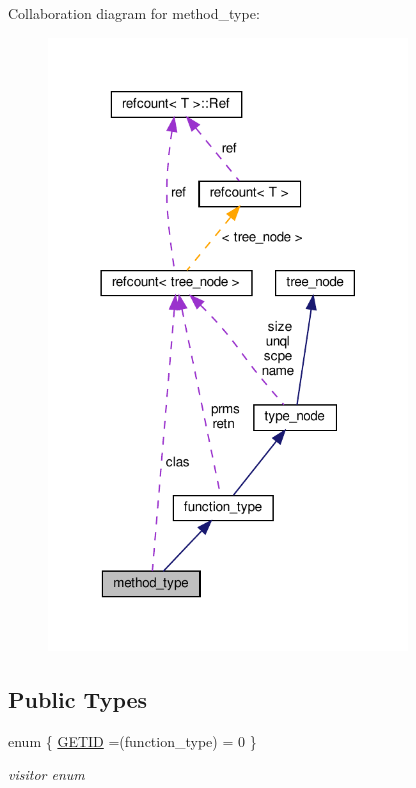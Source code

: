Collaboration diagram for method\+\_\+type\+:
\nopagebreak
\begin{figure}[H]
\begin{center}
\leavevmode
\includegraphics[width=270pt]{df/d3b/structmethod__type__coll__graph}
\end{center}
\end{figure}
\subsection*{Public Types}
\begin{DoxyCompactItemize}
\item 
enum \{ \hyperlink{structmethod__type_aa5c16c6f7cbcbbaf7b8f589729eb764aae8a00184f06f382b459ee942c9ce29e2}{G\+E\+T\+ID} =(function\+\_\+type) = 0
 \}\begin{DoxyCompactList}\small\item\em visitor enum \end{DoxyCompactList}
\end{DoxyCompactItemize}
